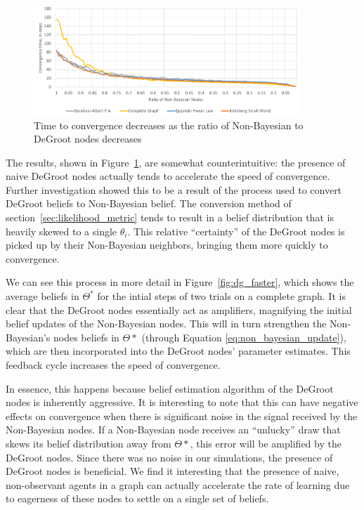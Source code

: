 \documentclass[letterpaper, 11pt, conference]{ieeeconf}
\begin{document}
\begin{figure}[h]
\centering
\includegraphics[width=0.9\textwidth]{figures/nb_ratio}
\caption{Time to convergence decreases as the ratio of Non-Bayesian to DeGroot nodes decreases}
\label{fig:nb_ratio}
\end{figure}

The results, shown in Figure~\ref{fig:nb_ratio}, are somewhat counterintuitive: the presence of naive DeGroot nodes actually tends to accelerate the speed of convergence.  Further investigation showed this to be a result of the process used to convert DeGroot beliefs to Non-Bayesian belief.  The conversion method of section~\ref{sec:likelihood_metric} tends to result in a belief distribution that is heavily skewed to a single $\theta_i$.  This relative ``certainty'' of the DeGroot nodes is picked up by their Non-Bayesian neighbors, bringing them more quickly to convergence.

We can see this process in more detail in Figure~\ref{fig:dg_faster}, which shows the average beliefs in $\Theta^*$ for the intial steps of two trials on a complete graph. It is clear that the DeGroot nodes essentially act as amplifiers, magnifying the initial belief updates of the Non-Bayesian nodes. This will in turn strengthen the Non-Bayesian's nodes beliefs in $\Theta*$ (through Equation \ref{eq:non_bayesian_update}), which are then incorporated into the DeGroot nodes' parameter estimates. This feedback cycle increases the speed of convergence.

In essence, this happens because belief estimation algorithm of the DeGroot nodes is inherently aggressive. It is interesting to note that this can have negative effects on convergence when there is significant noise in the signal received by the Non-Bayesian nodes. If a Non-Bayesian node receives an ``unlucky'' draw that skews its belief distribution away from $\Theta*$, this error will be amplified by the DeGroot nodes. Since there was no noise in our simulations, the presence of DeGroot nodes is beneficial. We find it interesting that the presence of naive, non-observant agents in a graph can actually accelerate the rate of learning due to eagerness of these nodes to settle on a single set of beliefs.
\end{document}
